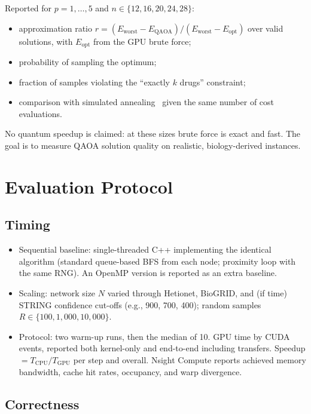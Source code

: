 Reported for $p=1,\dots,5$ and $n\in\{12,16,20,24,28\}$:
\begin{itemize}[nosep]
  \item approximation ratio $r = (E_{\text{worst}} - E_{\text{QAOA}})/(E_{\text{worst}} - E_{\text{opt}})$
        over valid solutions, with $E_{\text{opt}}$ from the GPU brute force;
  \item probability of sampling the optimum;
  \item fraction of samples violating the ``exactly $k$ drugs'' constraint;
  \item comparison with simulated annealing~\cite{kirkpatrick1983optimization}
        given the same number of cost evaluations.
\end{itemize}
No quantum speedup is claimed: at these sizes brute force is exact and fast.
The goal is to measure QAOA solution quality on realistic, biology-derived
instances.

\section{Evaluation Protocol}
\label{app:eval}

\subsection{Timing}

\begin{itemize}[nosep]
  \item Sequential baseline: single-threaded C++ implementing the identical
        algorithm (standard queue-based BFS from each node; proximity loop
        with the same RNG). An OpenMP version is reported as an extra
        baseline.
  \item Scaling: network size $N$ varied through Hetionet, BioGRID, and (if time) STRING confidence cut-offs
        (e.g., 900, 700, 400); random samples
        $R\in\{100,1{,}000,10{,}000\}$.
  \item Protocol: two warm-up runs, then the median of 10. GPU time by CUDA
        events, reported both kernel-only and end-to-end including
        transfers. Speedup $=T_{\text{CPU}}/T_{\text{GPU}}$ per step and
        overall. Nsight Compute reports achieved memory bandwidth, cache hit
        rates, occupancy, and warp divergence.
\end{itemize}

\subsection{Correctness}

